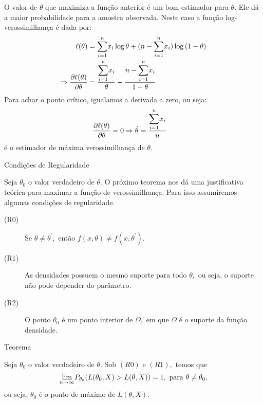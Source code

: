 \documentclass[12pt]{beamer}
\begin{document}
\begin{frame}{}
    \begin{block}{}
    \justifying
O valor de $\theta$ que maximiza a função anterior é um bom estimador para $\theta.$ Ele dá a maior probabilidade para a amostra observada. Neste caso a função log-verossimilhança é dada por:
\begin{align*}
\ell(\theta)&={\displaystyle \sum_{i=1}^{n}} x_{i}\log{\theta}+(n-{\displaystyle \sum_{i=1}^{n}} x_{i})\log{(1-\theta)}\\
\Rightarrow \dfrac{\partial\ell(\theta)}{\partial\theta}&=\dfrac{{\displaystyle \sum_{i=1}^{n}} x_{i}}{\theta}-\dfrac{n-{\displaystyle \sum_{i=1}^{n}} x_{i}}{1-\theta}
\end{align*}
Para achar o ponto crítico, igualamos a derivada a zero, ou seja:
\begin{align*}
\dfrac{\partial\ell(\theta)}{\partial\theta}=0&\Rightarrow \hat{\theta}=\dfrac{{\displaystyle \sum_{i=1}^{n}} x_{i}}{n}
\end{align*}
é o estimador de máxima verossimilhança de $\theta.$
\end{block}
\end{frame}

\begin{frame}{Condições de Regularidade}
\begin{block}{}
\justifying
Seja $\theta_{0}$ o valor verdadeiro de $\theta.$ O próximo teorema nos dá uma justificativa teórica para maximar a função de verossimilhança. Para isso assumiremos algumas condições de regularidade. 
\begin{description}
\item[(R0)~] Se $\theta\neq \theta^{'},$ então $f(x,\theta)\neq f(x,\theta^{'}).$
\item[(R1)~] As densidades possuem o mesmo suporte para todo $\theta,$ ou seja, o suporte não pode depender do parâmetro.
\item[(R2)~] O ponto $\theta_{0}$ é um ponto interior de $\Omega,$ em que $\Omega$ é o suporte da função densidade.
\end{description}
\end{block}
\end{frame}

\begin{frame}{Teorema}
\begin{Teorema}\label{Teo1}
\justifying
Seja $\theta_{0}$ o valor verdadeiro de $\theta.$ Sob $(R0)$ e $(R1),$ temos que
\begin{align*}
    {\displaystyle \lim_{n\to\infty}} P_{\theta_{0}}(L(\theta_{0},X)>L(\theta,X))=1,~\text{para}~\theta\neq \theta_{0},
\end{align*}
ou seja, $\theta_{0}$ é o ponto de máximo de $L(\theta,X).$
\end{Teorema}
\end{frame}
\end{document}
